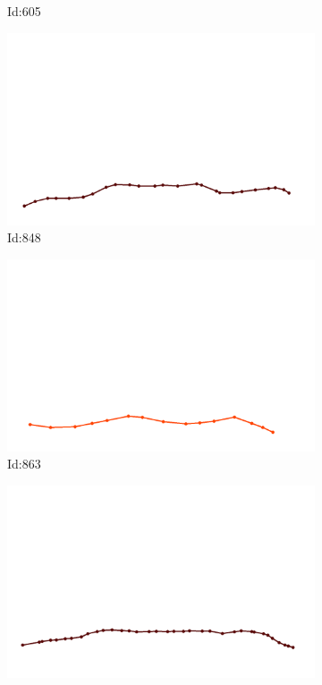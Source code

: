 \documentclass[12pt,twoside]{report}
\begin{document}
\begin{figure}
\begin{subfigure}[b]{0.20\textwidth}
\caption{Id:605}
\end{subfigure}
\begin{subfigure}[b]{0.20\textwidth}
\centering
\includegraphics[width=\textwidth]{../../trajectories/848.png}
\caption{Id:848}
\end{subfigure}
\begin{subfigure}[b]{0.20\textwidth}
\centering
\includegraphics[width=\textwidth]{../../trajectories/863.png}
\caption{Id:863}
\end{subfigure}
\begin{subfigure}[b]{0.20\textwidth}
\centering
\includegraphics[width=\textwidth]{../../trajectories/904.png}

\end{subfigure}
\end{figure}
\end{document}
